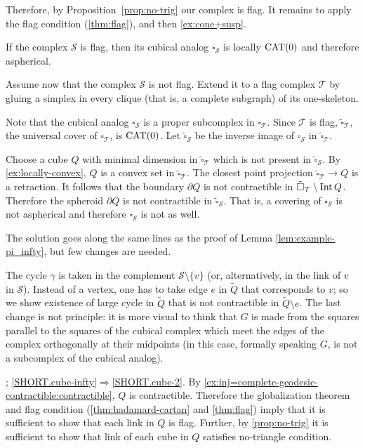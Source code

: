 Therefore, by Proposition~\ref{prop:no-trig} our complex is flag.
It remains to apply the flag condition (\ref{thm:flag}), and then \ref{ex:cone+susp}.

\setcounter{eqtn}{0}

If the complex $\mathcal{S}$ is flag, then its cubical analog $\square_{\mathcal{S}}$ is locally $\mathrm{CAT}(0)$ and therefore aspherical.

Assume now that the complex $\mathcal{S}$ is not flag. 
Extend it to a flag complex $\mathcal{T}$ by gluing a simplex in every clique (that is, a complete subgraph) of its one-skeleton.

Note that the cubical analog $\square_{\mathcal{S}}$ is a proper subcomplex in $\square_{\mathcal{T}}$.
Since $\mathcal{T}$ is flag,
$\tilde\square_{\mathcal{T}}$,
the universal cover of $\square_{\mathcal{T}}$, is $\mathrm{CAT}(0)$.
Let $\tilde\square_{\mathcal{S}}$ be the inverse image of $\square_{\mathcal{S}}$ in $\tilde\square_{\mathcal{T}}$.

Choose a cube $Q$ with minimal dimension in $\tilde\square_{\mathcal{T}}$ which is not present in $\tilde\square_{\mathcal{S}}$.
By \ref{ex:locally-convex}, $Q$ is a convex set in $\tilde\square_{\mathcal{T}}$.
The closest point projection $\tilde\square_{\mathcal{T}}\to Q$ is a retraction.
It follows that the boundary $\partial Q$ is not contractible in $\tilde\square_{\mathcal{T}}\setminus\operatorname{\rm Int}\nolimits Q$.
Therefore the spheroid $\partial Q$ is not contractible in $\tilde\square_{\mathcal{S}}$.
That is, a covering of $\square_{\mathcal{S}}$ is not aspherical and therefore $\square_{\mathcal{S}}$ is not as well.

The solution goes along the same lines as the proof of Lemma \ref{lem:example-pi_infty}, but few changes are needed.

The cycle $\gamma$ is taken in the complement $\mathcal{S}\setminus\{v\}$ (or, alternatively, in the link of $v$ in $\mathcal{S}$).
Instead of a vertex, one has to take edge $e$ in $\tilde Q$ that corresponds to $v$; so we show existence of large cycle in $\tilde Q$ that is not contractible in $\tilde Q\setminus e$.
The last change is not principle:
it is more visual to think that $G$ is made from the squares parallel to the squares of the cubical complex which meet the edges of the complex orthogonally at their midpoints (in this case, formally speaking $G$, is not a subcomplex of the cubical analog).

\parbf{\ref{ex:cube-infty=>cube-2}}; \ref{SHORT.cube-infty}$\Rightarrow$\ref{SHORT.cube-2}.
By \ref{ex:inj=complete-geodesic-contractible:contractible}, $Q$ is contractible.
Therefore the globalization theorem and flag condition (\ref{thm:hadamard-cartan} and \ref{thm:flag}) imply that it is sufficient to show that each link in $Q$ is flag.
Further, by \ref{prop:no-trig} it is sufficient to show that link of each cube in $Q$ satisfies no-triangle condition.

